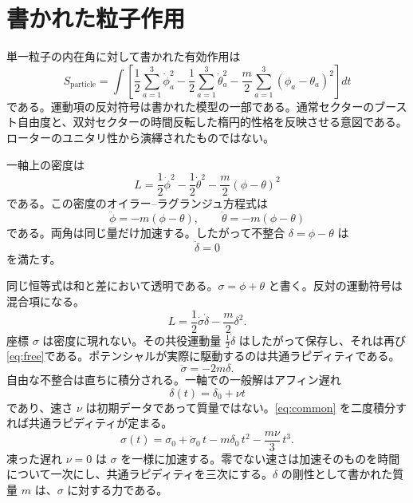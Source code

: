 \documentclass[a4paper]{article}
\begin{document}
\section{書かれた粒子作用}

単一粒子の内在角に対して書かれた有効作用は
\[
S_{\mathrm{particle}}
  =\int\left[
    \frac12\sum_{a=1}^3\dot\phi_a^2
    -\frac12\sum_{a=1}^3\dot\theta_a^2
    -\frac m2\sum_{a=1}^3(\phi_a-\theta_a)^2
  \right]dt
\]
である。運動項の反対符号は書かれた模型の一部である。通常セクターのブースト自由度と、双対セクターの時間反転した楕円的性格を反映させる意図である。ローターのユニタリ性から演繹されたものではない。

一軸上の密度は
\[
L
  =\frac12\dot\phi^2
  -\frac12\dot\theta^2
  -\frac m2(\phi-\theta)^2
\]
である。この密度のオイラー--ラグランジュ方程式は
\begin{equation}
\ddot\phi=-m(\phi-\theta),\qquad
\ddot\theta=-m(\phi-\theta)
\label{eq:written-el}
\end{equation}
である。両角は同じ量だけ加速する。したがって不整合 \(\delta=\phi-\theta\) は
\begin{equation}
\ddot\delta=0
\label{eq:free}
\end{equation}
を満たす。

同じ恒等式は和と差において透明である。\(\sigma=\phi+\theta\) と書く。反対の運動符号は混合項になる。
\begin{equation}
L
  =\frac12\dot\sigma\dot\delta
  -\frac m2\delta^2.
\label{eq:mixed}
\end{equation}
座標 \(\sigma\) は密度に現れない。その共役運動量 \(\frac12\dot\delta\) はしたがって保存し、それは再び\eqref{eq:free}である。ポテンシャルが実際に駆動するのは共通ラピディティである。
\begin{equation}
\ddot\sigma=-2m\delta.
\label{eq:common}
\end{equation}
自由な不整合は直ちに積分される。一軸での一般解はアフィン遅れ
\begin{equation}
\delta(t)=\delta_0+\nu t
\label{eq:affine}
\end{equation}
であり、速さ \(\nu\) は初期データであって質量ではない。\eqref{eq:common} を二度積分すれば共通ラピディティが定まる。
\begin{equation}
\sigma(t)
  =\sigma_0+\dot\sigma_0\,t
  -m\delta_0\,t^2
  -\frac{m\nu}{3}\,t^3.
\label{eq:cubic}
\end{equation}
凍った遅れ \(\nu=0\) は \(\sigma\) を一様に加速する。零でない速さは加速そのものを時間について一次にし、共通ラピディティを三次にする。\(\delta\) の剛性として書かれた質量 \(m\) は、\(\sigma\) に対する力である。
\end{document}
